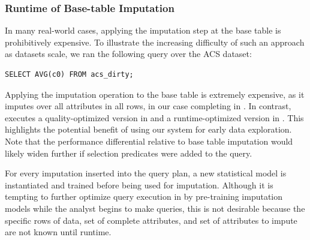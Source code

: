 \subsubsection{Runtime of Base-table Imputation}
In many real-world cases, applying the imputation step at the base table is prohibitively
expensive.
To illustrate the increasing difficulty of such an approach as datasets scale, we ran the following query over the ACS dataset:
\begin{lstlisting}[breaklines]
SELECT AVG(c0) FROM acs_dirty;
\end{lstlisting}
Applying the imputation operation to the base table is extremely expensive, as it imputes over all attributes in all rows, in our case
completing in \acsbaseresultminutes{}. In contrast, \ProjectName{} executes a quality-optimized version
in \acsimputedbzeroresult{} and a runtime-optimized version in \acsimputedboneresult{}. This highlights the potential
benefit of using our system for early data exploration. Note that the performance differential relative to base table imputation
would likely widen further if selection predicates were added to the query.

For every imputation inserted into the query plan, a new statistical model is instantiated and trained before being used for imputation.
Although it is tempting to further optimize query execution in \ProjectName{} by pre-training imputation models while the analyst begins to make queries,
this is not desirable because the specific rows of data, set of complete attributes, and set of attributes to impute are not known until runtime.



